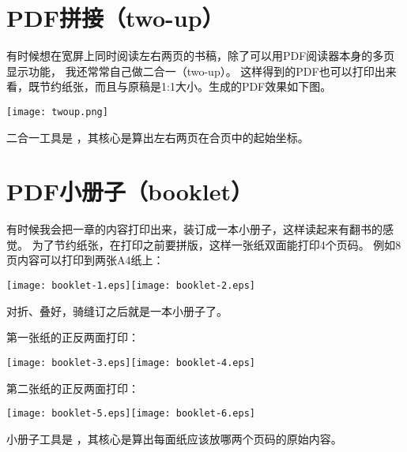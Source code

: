 \begindot
\item {}
\item {}
\myenddot



\section{PDF拼接（two-up）}
有时候想在宽屏上同时阅读左右两页的书稿，除了可以用PDF阅读器本身的多页显示功能，
我还常常自己做二合一（two-up）。
这样得到的PDF也可以打印出来看，既节约纸张，而且与原稿是1:1大小。生成的PDF效果如下图。

\vspace{1ex}
\centerline{\texttt{[image: twoup.png]}}

二合一工具是 ，其核心是算出左右两页在合页中的起始坐标。

\section{PDF小册子（booklet）}
有时候我会把一章的内容打印出来，装订成一本小册子，这样读起来有翻书的感觉。
为了节约纸张，在打印之前要拼版，这样一张纸双面能打印4个页码。
例如8页内容可以打印到两张A4纸上：

\vspace{1ex}
\centerline{\texttt{[image: booklet-1.eps]}\qquad\texttt{[image: booklet-2.eps]}}

对折、叠好，骑缝订之后就是一本小册子了。

\begin{center}
第一张纸的正反两面打印：\nopagebreak

\vspace{1ex}
\texttt{[image: booklet-3.eps]}\qquad\texttt{[image: booklet-4.eps]}

\vspace{1em}
第二张纸的正反两面打印：

\vspace{1ex}
\texttt{[image: booklet-5.eps]}\qquad\texttt{[image: booklet-6.eps]}
\end{center}

小册子工具是 ，其核心是算出每面纸应该放哪两个页码的原始内容。

